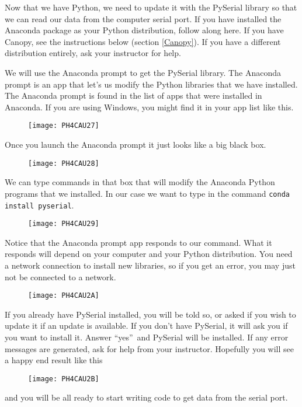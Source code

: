 Now that we have Python, we need to update it with the PySerial library so
that we can read our data from the computer serial port. If you have
installed the Anaconda package as your Python distribution, follow along
here. If you have Canopy, see the instructions below (section \ref{Canopy}).
If you have a different distribution entirely, ask your instructor for help.

We will use the Anaconda prompt to get the PySerial library. The Anaconda
prompt is an app that let's us modify the Python libraries that we have
installed. The Anaconda prompt is found in the list of apps that were
installed in Anaconda. If you are using Windows, you might find it in your
app list like this.

\begin{figure}[h!]
\texttt{[image: PH4CAU27]}
\end{figure}

Once you launch the Anaconda prompt it just looks like a big black box. 
\begin{figure}[h!]
\texttt{[image: PH4CAU28]}
\end{figure}We can type commands in that box
that will modify the Anaconda Python programs that we installed. In our case
we want to type in the command \texttt{conda install pyserial}.

\begin{figure}[h!]
\texttt{[image: PH4CAU29]}
\end{figure}

Notice that the Anaconda prompt app responds to our command. What it
responds will depend on your computer and your Python distribution. You need
a network connection to install new libraries, so if you get an error, you
may just not be connected to a network.

\begin{figure}[h!]
\texttt{[image: PH4CAU2A]}
\end{figure}If you already have PySerial
installed, you will be told so, or asked if you wish to update it if an
update is available. If you don't have PySerial, it will ask you if you want
to install it. Answer \textquotedblleft yes\textquotedblright\ and PySerial
will be installed. If any error messages are generated, ask for help from
your instructor. Hopefully you will see a happy end result like this \begin{figure}[h!]
\texttt{[image: PH4CAU2B]}
\end{figure}%
and you will be all ready to start writing code to get data from the serial
port.

